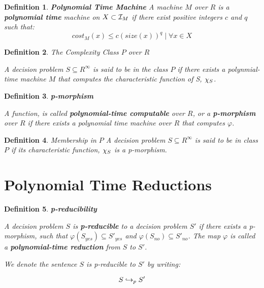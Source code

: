 \documentclass[twoside]{article}
\newtheorem{definition}{Definition}[section]
\begin{document}
\begin{definition}{\textbf{Polynomial Time Machine}}
  A machine $M$ over $R$ is a \textbf{polynomial time} machine on $X
  \subset \mathcal{I}_M$ if there exist positive integers $c$ and $q$
  such that:
  $$cost_M(x) \leq c(size(x))^q \mid \forall x \in X$$
\end{definition}
\begin{definition}{The Complexity Class $P$ over $R$}
  
  A decision problem $S \subseteq R^\infty$ is said to be in the class
  $P$ if there exists a polynmial-time machine $M$ that computes the
  characteristic function of S, $\chi_S$.

\end{definition}

\begin{definition}{\textbf{p-morphism}}
  
  A function,  is called
  \textbf{polynomial-time computable} over $R$, or a
  \textbf{p-morphism} over $R$ if there exists a polynomial time
  machine over $R$ that computes $\varphi$.

\end{definition}

\begin{definition}{Membership in $P$}
  A decision problem $S \subseteq R^\infty$ is said to be in class $P$
  if its characteristic function, $\chi_S$ is a p-morphism.
\end{definition}
 
\section{Polynomial Time Reductions}

\begin{definition}{\textbf{p-reducibility}}

  A decision problem $S$ is \textbf{p-reducible} to a decision problem
  $S'$ if there exists a p-morphism,
   such that $\varphi(S_{yes})
  \subseteq S'_{yes}$ and $\varphi(S_{no}) \subseteq S'_{no}$.  The
  map $\varphi$ is called a \textbf{polynomial-time reduction} from
  $S$ to $S'$.

  We denote the sentence $S$ is p-reducible to $S'$ by writing:

  $$S \hookrightarrow_p S'$$
  \end{definition}

\end{document}
